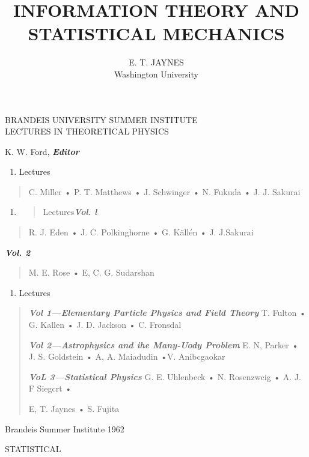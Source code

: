 \documentclass[]{article}
\title{INFORMATION THEORY AND STATISTICAL MECHANICS}
\author{E. T. JAYNES\\
Washington University}
\begin{document}
BRANDEIS UNIVERSITY SUMMER INSTITUTE\\
LECTURES IN THEORETICAL PHYSICS

K. W. Ford, \emph{\textbf{Editor}}

\begin{enumerate}
\def\labelenumi{\arabic{enumi}.}
\setcounter{enumi}{1959}
\item
  Lectures
\end{enumerate}

\begin{quote}
C. Miller • P. T. Matthews • J. Schwinger • N. Fukuda • J. J. Sakurai
\end{quote}

\begin{enumerate}
\def\labelenumi{\arabic{enumi}.}
\setcounter{enumi}{1960}
\item
  \begin{quote}
  Lectures\emph{\textbf{Vol. l}}
  \end{quote}
\end{enumerate}

\begin{quote}
R. J. Eden • J. C. Polkinghorne • G. Källén • J. J.Sakurai
\end{quote}

\emph{\textbf{Vol. 2}}

\begin{quote}
M. E. Rose • E, C. G. Sudarshan
\end{quote}

\begin{enumerate}
\def\labelenumi{\arabic{enumi}.}
\setcounter{enumi}{1961}
\item
  Lectures
\end{enumerate}

\begin{quote}
\emph{\textbf{Vol 1---Elementary Particle Physics and Field Theory}} T.
Fulton • G. Kallen • J. D. Jackson • C. Fronsdal

\emph{\textbf{Vol 2---Astrophysics and ihe Many-Uody Problem}} E. N,
Parker • J. S. Goldstein • A, A. Maiadudin •V. Anibcgaokar

\emph{\textbf{VoL 3---Statistical Physics}} G. E. Uhlenbeck • N.
Rosenzwcig • A. J. F Siegcrt •

E, T. Jaynes • S. Fujita
\end{quote}

Brandeis Summer Institute 1962

STATISTICAL
\end{document}
